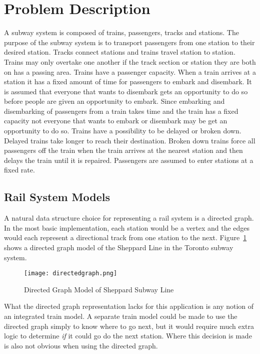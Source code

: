 \section{Problem Description}

A subway system is composed of trains, passengers, tracks and stations. The
purpose of the subway system is to transport passengers from one station to
their desired station. Tracks connect stations and trains travel station to
station. Trains may only overtake one another if the track section or station
they are both on has a passing area. Trains have a passenger capacity. When a
train arrives at a station it has a fixed amount of time for passengers to
embark and disembark. It is assumed that everyone that wants to disembark gets an
opportunity to do so before people are given an opportunity to embark. Since
embarking and disembarking of passengers from a train takes time and the train
has a fixed capacity not everyone that wants to embark or disembark may be
get an opportunity to do so. Trains have a possibility to be delayed or broken
down. Delayed trains take longer to reach their destination. Broken down trains
force all passengers off the train when the train arrives at the nearest station
and then delays the train until it is repaired. Passengers are assumed to enter
stations at a fixed rate.

\subsection{Rail System Models}
A natural data structure choice for representing a rail system is a directed graph.  In the most basic implementation, each station would be a vertex and the edges would each represent a directional track from one station to the next. Figure~\ref{fig:directedgraph} shows a directed graph model of the Sheppard Line in the Toronto subway system.
\begin{figure}[htb]
	\centering
	\texttt{[image: directedgraph.png]}
	\caption{Directed Graph Model of Sheppard Subway Line}
	\label{fig:directedgraph}
\end{figure}
What the directed graph representation lacks for this application is any notion of an integrated train model. A separate train model could be made to use the directed graph simply to know where to go next, but it would require much extra logic to determine \textit{if} it could go do the next station.  Where this decision is made is also not obvious when using the directed graph.

